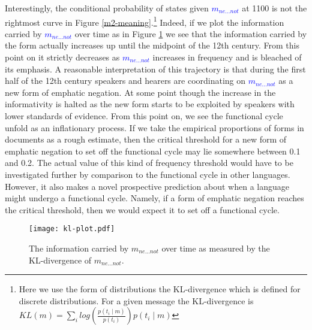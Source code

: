 \documentclass[linguex]{sp}
\theoremstyle{definition} \newtheorem{definition}{Definition}
\begin{document}
Interestingly, the conditional probability of states given \emph{\textcolor{blue}{$m_{ne...not}$}}  at 1100 is not the rightmost curve in Figure \ref{m2-meaning}.\footnote{Here we use the form of distributions the KL-divergence which is defined for discrete distributions. For a given message the KL-divergence is $KL( m ) = \sum_i log\left( \frac{p(t_i \mid m )}{p(t_i)}  \right)p(t_i \mid m )$} Indeed, if we plot the information carried by \emph{\textcolor{blue}{$m_{ne...not}$}}  over time as in Figure \ref{kl} we see that the information carried by the form actually increases up until the midpoint of the 12th century. From this point on it strictly decreases as \emph{\textcolor{blue}{$m_{ne...not}$}} increases in frequency and is bleached of its emphasis. A reasonable interpretation of this trajectory is that during the first half of the 12th century speakers and hearers are coordinating on \emph{\textcolor{blue}{$m_{ne...not}$}} as a new form of emphatic negation. At some point though the increase in the informativity is halted as the new form starts to be exploited by speakers with lower standards of evidence. From this point on, we see the functional cycle unfold as an inflationary process. If we take the empirical proportions of forms in documents as a rough estimate, then the critical threshold for a new form of emphatic negation to set off the functional cycle may lie somewhere between 0.1 and 0.2. The actual value of this kind of frequency threshold would have to be investigated further by comparison to the functional cycle in other languages. However, it also makes a novel prospective prediction about when a language might undergo a functional cycle. Namely, if a form of emphatic negation reaches the critical threshold, then we would expect it to set off a functional cycle.


\begin{figure}
\centering
     \texttt{[image: kl-plot.pdf]}
\caption{The information carried by \textit{\color{blue} $m_{ne...not}$} over time as measured by the KL-divergence of \textit{\color{blue} $m_{ne...not}$}.}
\label{kl}
\end{figure}
\end{document}
